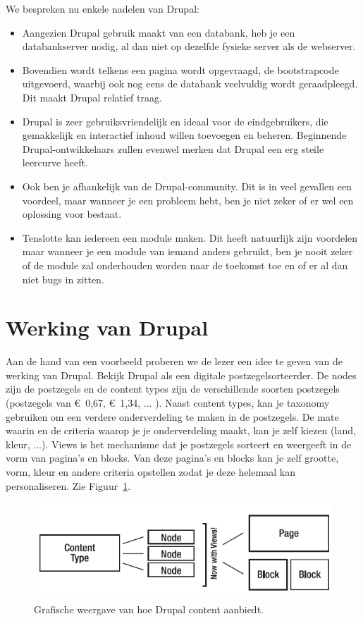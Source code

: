 We bespreken nu enkele nadelen van Drupal:
\begin{itemize}
\item Aangezien Drupal gebruik maakt van een databank, heb je een databankserver nodig, al dan niet op dezelfde fysieke server als de webserver.
\item Bovendien wordt telkens een pagina wordt opgevraagd, de bootstrapcode uitgevoerd, waarbij ook nog eens de databank veelvuldig wordt geraadpleegd. 
Dit maakt Drupal relatief traag.
\item Drupal is zeer gebruiksvriendelijk en ideaal voor de eindgebruikers, die gemakkelijk en interactief inhoud willen toevoegen en beheren. 
Beginnende Drupal-ontwikkelaars zullen evenwel merken dat Drupal een erg steile leercurve heeft.
\item Ook ben je afhankelijk van de Drupal-community. Dit is in veel gevallen een voordeel, maar wanneer je een probleem hebt, ben je niet zeker of er wel een oplossing voor bestaat.
\item Tenslotte kan iedereen een module maken. Dit heeft natuurlijk zijn voordelen maar wanneer je een module van iemand anders gebruikt, ben je nooit zeker of de module zal onderhouden worden naar de toekomst toe en of er al dan niet bugs in zitten.
\end{itemize}

\section{Werking van Drupal}

Aan de hand van een voorbeeld proberen we de lezer een idee te geven van de werking van Drupal. Bekijk Drupal als een digitale postzegelsorteerder. De nodes zijn de postzegels en de content types zijn de verschillende soorten postzegels (postzegels van \euro~0,67, \euro~1,34, ... ). Naast content types, kan je taxonomy gebruiken om een verdere onderverdeling te maken in de postzegels. De mate waarin en de criteria waarop je je onderverdeling maakt, kan je zelf kiezen (land, kleur, ...). Views is het mechanisme dat je postzegels sorteert en weergeeft in de vorm van pagina's en blocks. Van deze pagina's en blocks kan je zelf grootte, vorm, kleur en andere criteria opstellen zodat je deze helemaal kan personaliseren. Zie Figuur~\ref{fig:drupalGrafischeWeergave}.

\begin{figure}[h]
\centering
\includegraphics{fig/drupalGrafischeWeergave}
\centering
\vspace{-10pt}
\caption{Grafische weergave van hoe Drupal content aanbiedt.}
\vspace{-10pt}
\label{fig:drupalGrafischeWeergave}
\end{figure}

